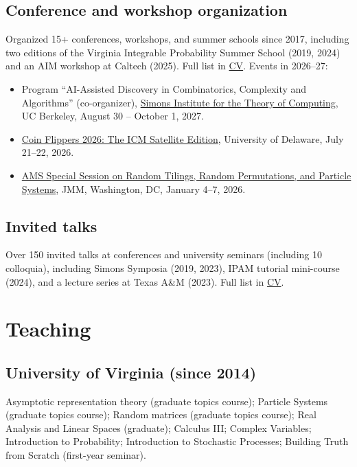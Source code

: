 \documentclass[letterpaper,11pt]{article}
\begin{document}
\subsection*{Conference and workshop organization}

Organized 15+ conferences, workshops, and summer schools since 2017,
including two editions of the Virginia Integrable Probability Summer School (2019, 2024)
and an AIM workshop at Caltech (2025).
Full list in \href{https://lpetrov.cc/research/petrovCV.pdf}{CV}.
Events in 2026--27:

\begin{itemize}
	\item
	Program ``AI-Assisted Discovery in Combinatorics, Complexity and Algorithms'' (co-organizer),
	\href{https://simons.berkeley.edu/}{Simons Institute for the Theory of Computing}, UC Berkeley,
	August 30 -- October 1, 2027.

	\item
	\href{https://www.coinflippers.org/coin-flippers-2026}{Coin Flippers 2026: The ICM Satellite Edition},
	University of Delaware, July 21--22, 2026.

	\item
	\href{https://jointmathematicsmeetings.org/jmm}{AMS Special Session on Random Tilings, Random Permutations, and Particle Systems},
	JMM, Washington, DC, January 4--7, 2026.
\end{itemize}

\subsection*{Invited talks}

Over 150 invited talks at conferences and university seminars (including 10 colloquia),
including Simons Symposia (2019, 2023), IPAM tutorial mini-course (2024),
and a lecture series at Texas A\&M (2023).
Full list in \href{https://lpetrov.cc/research/petrovCV.pdf}{CV}.

\section*{Teaching}

\subsection*{University of Virginia (since 2014)}

Asymptotic representation theory (graduate topics course);
Particle Systems (graduate topics course);
Random matrices (graduate topics course);
Real Analysis and Linear Spaces (graduate);
Calculus III;
Complex Variables;
Introduction to Probability;
Introduction to Stochastic Processes;
Building Truth from Scratch (first-year seminar).
\end{document}
